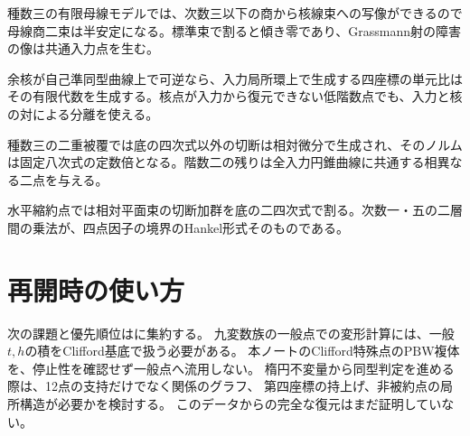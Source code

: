 \documentclass[11pt,a4paper]{ltjsarticle}
\begin{document}
種数三の有限母線モデルでは、次数三以下の商から核線束への写像ができるので母線商二束は半安定になる。標準束で割ると傾き零であり、Grassmann射の障害の像は共通入力点を生む。

余核が自己準同型曲線上で可逆なら、入力局所環上で生成する四座標の単元比はその有限代数を生成する。核点が入力から復元できない低階数点でも、入力と核の対による分離を使える。

種数三の二重被覆では底の四次式以外の切断は相対微分で生成され、そのノルムは固定八次式の定数倍となる。階数二の残りは全入力円錐曲線に共通する相異なる二点を与える。

水平縮約点では相対平面束の切断加群を底の二四次式で割る。次数一・五の二層間の乗法が、四点因子の境界のHankel形式そのものである。

\section{再開時の使い方}
次の課題と優先順位はに集約する。
九変数族の一般点での変形計算には、一般$t,h$の積をClifford基底で扱う必要がある。
本ノートのClifford特殊点の$\mathrm{PBW}$複体を、停止性を確認せず一般点へ流用しない。
楕円不変量から同型判定を進める際は、12点の支持だけでなく関係のグラフ、
第四座標の持上げ、非被約点の局所構造が必要かを検討する。
このデータからの完全な復元はまだ証明していない。
\end{document}
